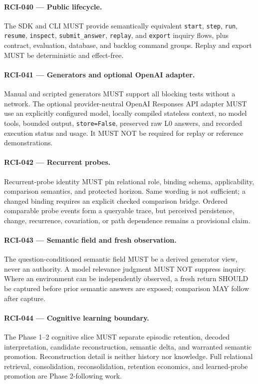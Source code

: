 \documentclass[11pt]{article}
\begin{document}
\paragraph{RCI-040 --- Public lifecycle.}
The SDK and CLI MUST provide semantically equivalent \texttt{start},
\texttt{step}, \texttt{run}, \texttt{resume}, \texttt{inspect},
\texttt{submit\_answer}, \texttt{replay}, and \texttt{export} inquiry flows,
plus contract, evaluation, database, and backlog command groups. Replay and
export MUST be deterministic and effect-free.

\paragraph{RCI-041 --- Generators and optional OpenAI adapter.}
Manual and scripted generators MUST support all blocking tests without a
network. The optional provider-neutral OpenAI Responses API adapter MUST use an
explicitly configured model, locally compiled stateless context, no model
tools, bounded output, \texttt{store=False}, preserved raw L0 answers, and
recorded execution status and usage. It MUST NOT be required for replay or
reference demonstrations.

\paragraph{RCI-042 --- Recurrent probes.}
Recurrent-probe identity MUST pin relational role, binding schema,
applicability, comparison semantics, and protected horizon. Same wording is not
sufficient; a changed binding requires an explicit checked comparison bridge.
Ordered comparable probe events form a queryable trace, but perceived
persistence, change, recurrence, covariation, or path dependence remains a
provisional claim.

\paragraph{RCI-043 --- Semantic field and fresh observation.}
The question-conditioned semantic field MUST be a derived generator view, never
an authority. A model relevance judgment MUST NOT suppress inquiry. Where an
environment can be independently observed, a fresh return SHOULD be captured
before prior semantic answers are exposed; comparison MAY follow after capture.

\paragraph{RCI-044 --- Cognitive learning boundary.}
The Phase 1--2 cognitive slice MUST separate episodic retention, decoded
interpretation, candidate reconstruction, semantic delta, and warranted
semantic promotion. Reconstruction detail is neither history nor knowledge.
Full relational retrieval, consolidation, reconsolidation, retention economics,
and learned-probe promotion are Phase 2-following work.
\end{document}

